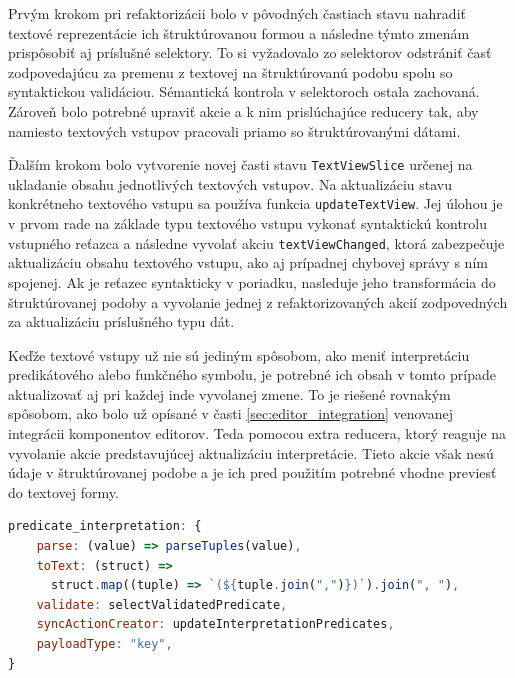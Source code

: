 
Prvým krokom pri refaktorizácii bolo v pôvodných častiach stavu nahradiť textové reprezentácie ich štruktúrovanou formou a následne týmto zmenám prispôsobiť aj príslušné selektory. To si vyžadovalo zo selektorov odstrániť časť zodpovedajúcu za premenu z textovej na štruktúrovanú podobu spolu so syntaktickou validáciou. Sémantická kontrola v selektoroch ostala zachovaná. Zároveň bolo potrebné upraviť akcie a k nim prislúchajúce reducery tak, aby namiesto textových vstupov pracovali priamo so štruktúrovanými dátami.

Ďalším krokom bolo vytvorenie novej časti stavu \texttt{TextViewSlice} určenej na ukladanie obsahu jednotlivých textových vstupov. Na aktualizáciu stavu konkrétneho textového vstupu sa používa funkcia \texttt{updateTextView}. Jej úlohou je v prvom rade na základe typu textového vstupu vykonať syntaktickú kontrolu vstupného reťazca a následne vyvolať akciu \texttt{textViewChanged}, ktorá zabezpečuje aktualizáciu obsahu textového vstupu, ako aj prípadnej chybovej správy s ním spojenej. Ak je reťazec syntakticky v poriadku, nasleduje jeho transformácia do štruktúrovanej podoby a vyvolanie jednej z refaktorizovaných akcií zodpovedných za aktualizáciu príslušného typu dát.

Keďže textové vstupy už nie sú jediným spôsobom, ako meniť interpretáciu predikátového alebo funkčného symbolu, je potrebné ich obsah v tomto prípade aktualizovať aj pri každej inde vyvolanej zmene. To je riešené rovnakým spôsobom, ako bolo už opísané v časti \ref{sec:editor_integration} venovanej integrácii komponentov editorov. Teda pomocou extra reducera, ktorý reaguje na vyvolanie akcie predstavujúcej aktualizáciu interpretácie. Tieto akcie však nesú údaje v štruktúrovanej podobe a je ich pred použitím potrebné vhodne previesť do textovej formy.

\begin{lstlisting}[float,language=JavaScript,caption={Konfiguračný objekt popisujúci interpretáciu predikátov.},label=prog:config_pred]
predicate_interpretation: {
    parse: (value) => parseTuples(value),
    toText: (struct) =>
      struct.map((tuple) => `(${tuple.join(",")})`).join(", "),
    validate: selectValidatedPredicate,
    syncActionCreator: updateInterpretationPredicates,
    payloadType: "key",
}
\end{lstlisting}

